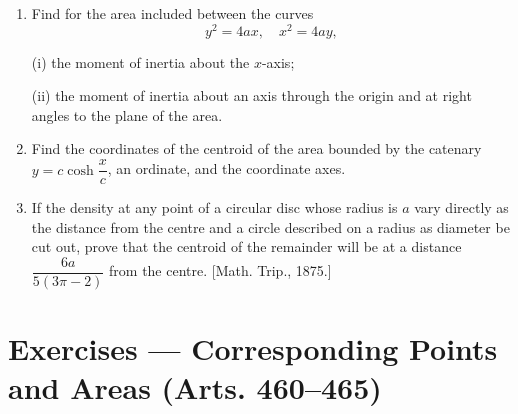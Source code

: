 \documentclass[11pt, a4paper]{article}
\newcommand{\source}[1]{\hfill\textnormal{[#1]}}
\begin{document}
\begin{enumerate}[leftmargin=2em]
\item Find for the area included between the curves
\[
y^2=4ax,\quad x^2=4ay,
\]

(i) the moment of inertia about the $x$-axis;

(ii) the moment of inertia about an axis through the origin and at right angles to the plane of the area.

\item Find the coordinates of the centroid of the area bounded by the catenary $y=c\cosh\dfrac{x}{c}$, an ordinate, and the coordinate axes.

\item If the density at any point of a circular disc whose radius is $a$ vary directly as the distance from the centre and a circle described on a radius as diameter be cut out, prove that the centroid of the remainder will be at a distance $\dfrac{6a}{5(3\pi-2)}$ from the centre. \source{Math. Trip., 1875.}

\end{enumerate}

\section*{Exercises --- Corresponding Points and Areas (Arts. 460--465)}
\end{document}
